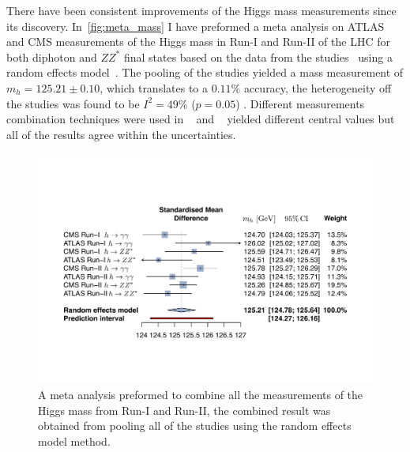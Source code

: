 There have been consistent improvements of the Higgs mass measurements since its discovery. In~\autoref{fig:meta_mass} I have preformed a meta analysis on ATLAS and CMS measurements of the Higgs mass in Run-I and Run-II of the LHC for both diphoton and $ZZ^*$ final states based on the data from the studies~\cite{ATLAS:2015yey,ATLAS:2018tdk,CMS:2017dib,CMS:2020xrn} using a random effects model~\cite{aronow_miller_2019}. The pooling of the studies yielded a mass measurement of $ m_h = 125.21 \pm 0.10$, which translates to a $0.11\%$ accuracy, the heterogeneity off the studies was found to be $I^2 =49\%$ ($p=0.05$) . Different measurements combination techniques were used in ~\cite{CMS:2020xrn} and ~\cite{Zyla:2020zbs} yielded different central values but all of the results agree within the uncertainties. 
\begin{figure}[h!]
	\begin{center}
\includegraphics[width=1.\textwidth]{figures/foreest_pllot_higgs_mass}
		\caption{A meta analysis preformed to combine all the measurements of the Higgs mass from Run-I and Run-II, the combined result was obtained from pooling all of the studies using the random effects model method.\label{fig:meta_mass} }
	\end{center}
\end{figure}

